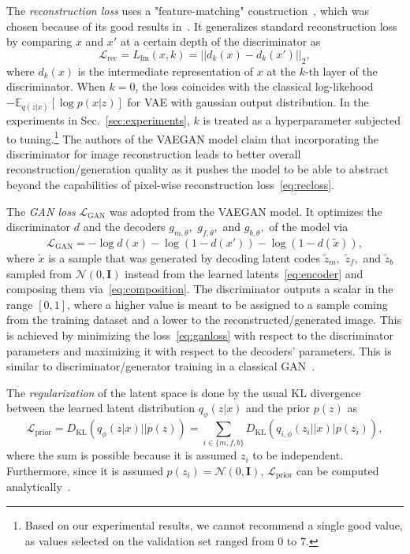 The \emph{reconstruction loss} uses a "feature-matching" construction~\cite{salimans2016fmgan}, which was chosen because of its good results in~\cite{vskvara2021comparison}. It generalizes standard reconstruction loss by comparing $x$ and $x'$ at a certain depth of the discriminator  as
\begin{equation} \label{eq:recloss}
     \mathcal{L}_{\text{rec}} = L_{\text{fm}}(x,k) =\vert \vert d_k(x) - d_{k}(x{'}) \vert \vert_2,
\end{equation} 
where $d_k(x)$ is the intermediate representation of $x$ at the $k$-th layer of the discriminator. When $k=0$, the loss coincides with the classical log-likehood $-\mathbb{E}_{q(z \vert x)}[\log p(x \vert z)]$ for VAE with gaussian output distribution. In the experiments in Sec.~\ref{sec:experiments}, $k$ is treated as a hyperparameter subjected to tuning.\footnote{Based on our experimental results, we cannot recommend a single good value, as values selected on the validation set ranged from 0 to 7.} The authors of the VAEGAN model claim that incorporating the discriminator for image reconstruction leads to better overall reconstruction/generation quality as it pushes the model to be able to abstract beyond the capabilities of pixel-wise reconstruction loss~\eqref{eq:recloss}.

The \emph{GAN loss} $\mathcal{L}_{\text{GAN}}$ was adopted from the VAEGAN model. It optimizes the discriminator $d$ and the decoders $g_{m,\theta},$ $g_{f,\theta},$ and $g_{b,\theta},$ of the model via
\begin{equation} \label{eq:ganloss}
    \mathcal{L}_{\text{GAN}} = - \log d(x) - \log (1 - d(x')) - \log (1-d(\tilde{x})),
\end{equation}
where $\tilde{x}$ is a sample that was generated by decoding latent codes $\tilde{z}_m,$ $\tilde{z}_f,$ and $\tilde{z}_b$ sampled from $\mathcal{N}(0,\textbf{I})$ instead from the learned latents~\eqref{eq:encoder} and composing them via~\eqref{eq:composition}. The discriminator outputs a scalar in the range $[0,1]$, where a higher value is meant to be assigned to a sample coming from the training dataset and a lower to the reconstructed/generated image. This is achieved by minimizing the loss~\eqref{eq:ganloss} with respect to the discriminator parameters and maximizing it with respect to the decoders' parameters. This is similar to discriminator/generator training in a classical GAN~\cite{goodfellow2014gan}.

The \emph{regularization} of the latent space is done by the usual KL divergence~\cite{kingma2013vae} between the learned latent distribution $q_{\phi} (z \vert x)$ and the prior $p(z)$ as
\begin{equation} \label{eq:kldloss}
    \mathcal{L}_{\text{prior}} = D_\text{KL} (q_{\phi} (z \vert x) \vert \vert p(z)) = \sum_{i \in \lbrace m, f, b \rbrace} D_\text{KL} (q_{i,\phi} (z_i \vert \vert x) \vert p(z_i)),
\end{equation} 
where the sum is possible because it is assumed $z_i$ to be independent. Furthermore, since it is assumed $p(z_i) = \mathcal{N}(0,\mathbf{I})$, $\mathcal{L}_{\text{prior}}$ can be computed analytically~\cite{kingma2013vae}.

